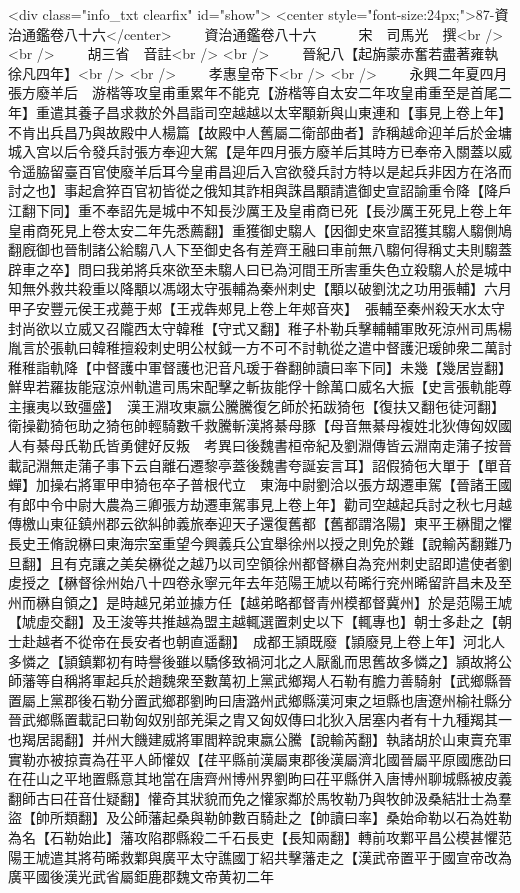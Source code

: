 <div class="info_txt clearfix" id="show">
<center style="font-size:24px;">87-資治通鑑卷八十六</center>
  　　資治通鑑卷八十六　　　宋　司馬光　撰<br />
<br />
　　胡三省　音註<br />
<br />
　　晉紀八【起旃蒙赤奮若盡著雍執徐凡四年】<br />
<br />
　　孝惠皇帝下<br />
<br />
　　永興二年夏四月張方廢羊后　游楷等攻皇甫重累年不能克【游楷等自太安二年攻皇甫重至是首尾二年】重遣其養子昌求救於外昌詣司空越越以太宰顒新與山東連和【事見上卷上年】不肯出兵昌乃與故殿中人楊篇【故殿中人舊屬二衛部曲者】詐稱越命迎羊后於金墉城入宫以后令發兵討張方奉迎大駕【是年四月張方廢羊后其時方已奉帝入關蓋以威令遥脇留臺百官使廢羊后耳今皇甫昌迎后入宫欲發兵討方特以是起兵非因方在洛而討之也】事起倉猝百官初皆從之俄知其詐相與誅昌顒請遣御史宣詔諭重令降【降戶江翻下同】重不奉詔先是城中不知長沙厲王及皇甫商已死【長沙厲王死見上卷上年皇甫商死見上卷太安二年先悉薦翻】重獲御史騶人【因御史來宣詔獲其騶人騶側鳩翻廐御也晉制諸公給騶八人下至御史各有差齊王融曰車前無八騶何得稱丈夫則騶蓋辟車之卒】問曰我弟將兵來欲至未騶人曰已為河間王所害重失色立殺騶人於是城中知無外救共殺重以降顒以馮翊太守張輔為秦州刺史【顒以破劉沈之功用張輔】六月甲子安豐元侯王戎薨于郟【王戎犇郟見上卷上年郟音夾】　張輔至秦州殺天水太守封尚欲以立威又召隴西太守韓稚【守式又翻】稚子朴勒兵擊輔輔軍敗死涼州司馬楊胤言於張軌曰韓稚擅殺刺史明公杖鉞一方不可不討軌從之遣中督護汜瑗帥衆二萬討稚稚詣軌降【中督護中軍督護也汜音凡瑗于眷翻帥讀曰率下同】未幾【幾居豈翻】鮮卑若羅抜能寇涼州軌遣司馬宋配擊之斬抜能俘十餘萬口威名大振【史言張軌能尊主攘夷以致彊盛】　漢王淵攻東嬴公騰騰復乞師於拓跋猗㐌【復扶又翻㐌徒河翻】衛操勸猗㐌助之猗㐌帥輕騎數千救騰斬漢將綦母豚【母音無綦母複姓北狄傳匈奴國人有綦母氏勒氏皆勇健好反叛　考異曰後魏書桓帝紀及劉淵傳皆云淵南走蒲子按晉載記淵無走蒲子事下云自離石遷黎亭蓋後魏書夸誕妄言耳】詔假猗㐌大單于【單音蟬】加操右將軍甲申猗㐌卒子普根代立　東海中尉劉洽以張方刼遷車駕【晉諸王國有郎中令中尉大農為三卿張方劫遷車駕事見上卷上年】勸司空越起兵討之秋七月越傳檄山東征鎮州郡云欲糾帥義旅奉迎天子還復舊都【舊都謂洛陽】東平王楙聞之懼長史王脩說楙曰東海宗室重望今興義兵公宜舉徐州以授之則免於難【說輸芮翻難乃旦翻】且有克讓之美矣楙從之越乃以司空領徐州都督楙自為兖州刺史詔即遣使者劉䖍授之【楙督徐州始八十四卷永寧元年去年范陽王虓以苟晞行兖州晞留許昌未及至州而楙自領之】是時越兄弟並據方任【越弟略都督青州模都督冀州】於是范陽王虓【虓虛交翻】及王浚等共推越為盟主越輒選置刺史以下【輒專也】朝士多赴之【朝士赴越者不從帝在長安者也朝直遥翻】　成都王頴既廢【頴廢見上卷上年】河北人多憐之【頴鎮鄴初有時譽後雖以驕侈致禍河北之人厭亂而思舊故多憐之】頴故將公師藩等自稱將軍起兵於趙魏衆至數萬初上黨武鄉羯人石勒有膽力善騎射【武鄉縣晉置屬上黨郡後石勒分置武鄉郡劉昫曰唐潞州武鄉縣漢河東之垣縣也唐遼州榆社縣分晉武鄉縣置載記曰勒匈奴别部羌渠之胄又匈奴傳曰北狄入居塞内者有十九種羯其一也羯居謁翻】并州大饑建威將軍閻粹說東嬴公騰【說輸芮翻】執諸胡於山東賣充軍實勒亦被掠賣為茌平人師懽奴【荏平縣前漢屬東郡後漢屬濟北國晉屬平原國應劭曰在茌山之平地置縣意其地當在唐齊州博州界劉昫曰茌平縣併入唐博州聊城縣被皮義翻師古曰茌音仕疑翻】懽奇其狀貌而免之懽家鄰於馬牧勒乃與牧帥汲桑結壯士為羣盜【帥所類翻】及公師藩起桑與勒帥數百騎赴之【帥讀曰率】桑始命勒以石為姓勒為名【石勒始此】藩攻陷郡縣殺二千石長吏【長知兩翻】轉前攻鄴平昌公模甚懼范陽王虓遣其將苟晞救鄴與廣平太守譙國丁紹共擊藩走之【漢武帝置平于國宣帝改為廣平國後漢光武省屬鉅鹿郡魏文帝黄初二年